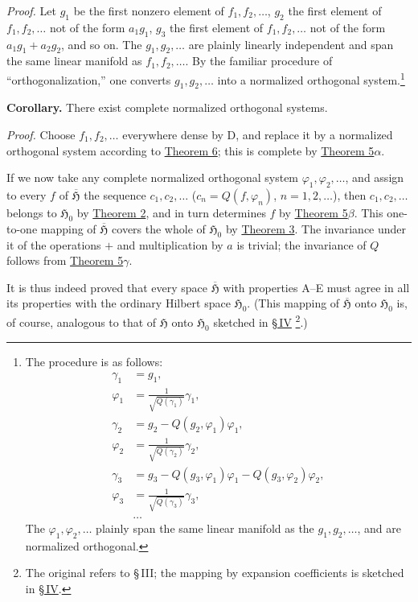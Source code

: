 \documentclass[fontsize=13pt,paper=b5,twoside,bookmarkpackage=false]{scrartcl}
\newcommand{\Sec}[1]{\hyperref[sec:#1]{\S\,#1}}
\newcounter{translatornote}
\newcommand{\tnote}[1]{%
  \begingroup\stepcounter{translatornote}%
  \renewcommand{\thefootnote}{T\arabic{translatornote}}%
  \footnote[0]{#1}\endgroup}
\begin{document}
\par\noindent\textit{Proof.}
Let $g_1$ be the first nonzero element of $f_1,f_2,\ldots$, $g_2$ the first element of $f_1,f_2,\ldots$ not of the form $a_1g_1$, $g_3$ the first element of $f_1,f_2,\ldots$ not of the form $a_1g_1+a_2g_2$, and so on. The $g_1,g_2,\ldots$ are plainly linearly independent and span the same linear manifold as $f_1,f_2,\ldots$. By the familiar procedure of ``orthogonalization,'' one converts $g_1,g_2,\ldots$ into a normalized orthogonal system.\footnote[20]{\label{fn:20}The procedure is as follows:
\begin{align*}
\gamma_1&=g_1,\\
\varphi_1&=\frac{1}{\sqrt{Q(\gamma_1)}}\gamma_1,\\
\gamma_2&=g_2-Q(g_2,\varphi_1)\varphi_1,\\
\varphi_2&=\frac{1}{\sqrt{Q(\gamma_2)}}\gamma_2,\\
\gamma_3&=g_3-Q(g_3,\varphi_1)\varphi_1-Q(g_3,\varphi_2)\varphi_2,\\
\varphi_3&=\frac{1}{\sqrt{Q(\gamma_3)}}\gamma_3,\\
&\ldots
\end{align*}
The $\varphi_1,\varphi_2,\ldots$ plainly span the same linear manifold as the $g_1,g_2,\ldots$, and are normalized orthogonal.
}

\par\medskip\noindent\textbf{Corollary.}\label{cor:VI:6}
There exist complete normalized orthogonal systems.

\par\noindent\textit{Proof.}
Choose $f_1,f_2,\ldots$ everywhere dense by D, and replace it by a normalized orthogonal system according to \hyperref[thm:VI:6]{Theorem 6}; this is complete by \hyperref[thm:VI:5]{Theorem 5$\alpha$}.

If we now take any complete normalized orthogonal system $\varphi_1,\varphi_2,\ldots$, and assign to every $f$ of $\overline{\mathfrak{H}}$ the sequence $c_1,c_2,\ldots$ ($c_n=Q(f,\varphi_n)$, $n=1,2,\ldots$), then $c_1,c_2,\ldots$ belongs to $\mathfrak{H}_0$ by \hyperref[thm:VI:2]{Theorem 2}, and in turn determines $f$ by \hyperref[thm:VI:5]{Theorem 5$\beta$}. This one-to-one mapping of $\overline{\mathfrak{H}}$ covers the whole of $\mathfrak{H}_0$ by \hyperref[thm:VI:3]{Theorem 3}. The invariance under it of the operations $+$ and multiplication by $a$ is trivial; the invariance of $Q$ follows from \hyperref[thm:VI:5]{Theorem 5$\gamma$}.

It is thus indeed proved that every space $\overline{\mathfrak{H}}$ with properties A--E must agree in all its properties with the ordinary Hilbert space $\mathfrak{H}_0$. (This mapping of $\overline{\mathfrak{H}}$ onto $\mathfrak{H}_0$ is, of course, analogous to that of $\mathfrak{H}$ onto $\mathfrak{H}_0$ sketched in \Sec{IV}\tnote{The original refers to \S\,III; the mapping by expansion coefficients is sketched in \Sec{IV}.}.)
\end{document}
